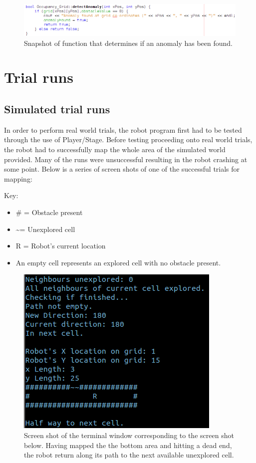 \documentclass[a4paper,12pt]{article}
\begin{document}
\begin{figure}[H]
\includegraphics[scale=0.65]{Detect_Anomaly_SS.png}
\caption{Snapshot of function that determines if an anomaly has been found.}
\end{figure}

\section{Trial runs}

\subsection{Simulated trial runs}
\noindent In order to perform real world trials, the robot program first had to be tested through the use of Player/Stage. Before testing proceeding onto real world trials, the robot had to successfully map the whole area of the simulated world provided. Many of the runs were unsuccessful resulting in the robot crashing at some point. Below is a series of screen shots of one of the successful trials for mapping:

\vspace{5mm}
\noindent Key:
\begin{itemize}
\item \# = Obstacle present
\item \textasciitilde = Unexplored cell
\item R = Robot's current location
\item An empty cell represents an explored cell with no obstacle present.
\end{itemize}

\begin{figure}[H]
\includegraphics[scale=1.0]{RunT1.png}
\caption{Screen shot of the terminal window corresponding to the screen shot below. Having mapped the the bottom area and hitting a dead end, the robot return along its path to the next available unexplored cell.}
\end{figure}
\end{document}
